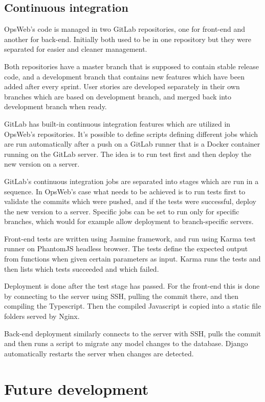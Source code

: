 \subsection{Continuous integration}
OpsWeb's code is managed in two GitLab repositories, one for front-end and another for back-end. Initially both used to be in one repository but they were separated for easier and cleaner management.

Both repositories have a master branch that is supposed to contain stable release code, and a development branch that contains new features which have been added after every sprint. User stories are developed separately in their own branches which are based on development branch, and merged back into development branch when ready.

GitLab has built-in continuous integration features which are utilized in OpsWeb's repositories. It's possible to define scripts defining different jobs which are run automatically after a push on a GitLab runner that is a Docker container running on the GitLab server. The idea is to run test first and then deploy the new version on a server.

GitLab's continuous integration jobs are separated into stages which are run in a sequence. In OpsWeb's case what needs to be achieved is to run tests first to validate the commits which were pushed, and if the tests were successful, deploy the new version to a server. Specific jobs can be set to run only for specific branches, which would for example allow deployment to branch-specific servers.

Front-end tests are written using Jasmine framework, and run using Karma test runner on PhantomJS headless browser. The tests define the expected output from functions when given certain parameters as input. Karma runs the tests and then lists which tests succeeded and which failed.

Deployment is done after the test stage has passed. For the front-end this is done by connecting to the server using SSH, pulling the commit there, and then compiling the Typescript. Then the compiled Javascript is copied into a static file folders served by Nginx.

Back-end deployment similarly connects to the server with SSH, pulls the commit and then runs a script to migrate any model changes to the database. Django automatically restarts the server when changes are detected.
\section{Future development}